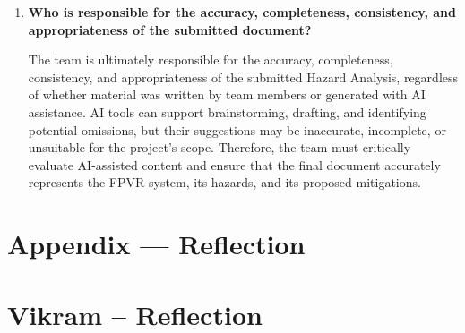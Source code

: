 \documentclass{article}
\begin{document}
\begin{enumerate}
    \item \textbf{Who is responsible for the accuracy, completeness, consistency, and appropriateness of the submitted document?}

    The team is ultimately responsible for the accuracy, completeness, consistency, and appropriateness of the submitted Hazard Analysis, regardless of whether material was written by team members or generated with AI assistance. AI tools can support brainstorming, drafting, and identifying potential omissions, but their suggestions may be inaccurate, incomplete, or unsuitable for the project's scope. Therefore, the team must critically evaluate AI-assisted content and ensure that the final document accurately represents the FPVR system, its hazards, and its proposed mitigations.
\end{enumerate}



\newpage{}

\section{Appendix --- Reflection}




\section*{Vikram -- Reflection}
\end{document}
